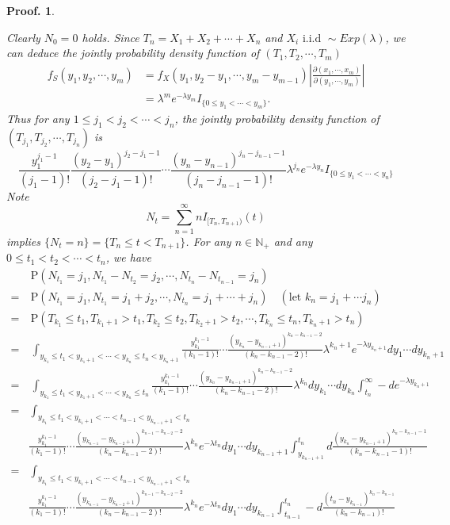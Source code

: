 \documentclass{article}
\theoremstyle{nonumberplain}
\newtheorem{Proof}{Proof.}
\begin{document}
\begin{Proof}
\begin{itemize}
	\noindent Clearly $N_0=0$ holds. Since $T_n=X_1+X_2+\cdots+X_n$ and $X_i\text{ i.i.d }\sim Exp(\lambda)$, we can deduce the jointly probability density function of $(T_1,T_2,\cdots,T_m)$ 
	\begin{align*}
	f_S(y_1,y_2,\cdots,y_m)&=f_X(y_1,y_2-y_1,\cdots,y_m-y_{m-1})\left|\frac{\partial(x_1,\cdots,x_m)}{\partial(y_1,\cdots,y_m)}\right|\\
	&=\lambda^m e^{-\lambda y_m}I_{\{0\le y_1<\cdots<y_m\}}.
	\end{align*}
	Thus for any $1\le j_1<j_2<\cdots<j_n$, the jointly probability density function of $(T_{j_1},T_{j_2},\cdots,T_{j_n})$ is
	\[
	\frac{y_1^{j_1-1}}{(j_1-1)!}\frac{(y_2-y_1)^{j_2-j_1-1}}{(j_2-j_1-1)!}\cdots\frac{(y_n-y_{n-1})^{j_n-j_{n-1}-1}}{(j_n-j_{n-1}-1)!}\lambda^{j_n}e^{-\lambda y_n}I_{\{0\le y_1<\cdots<y_n\}}
	\]
	Note $$N_t=\sum_{n=1}^{\infty}nI_{[T_n,T_{n+1})}(t)$$ implies $\{N_t=n\}=\{T_n\le t<T_{n+1}\}$. For any $n\in \mathbb{N}_+$ and any $0\le t_1<t_2<\cdots<t_n$, we have
	\begin{align*}
	&\ \mathrm{P}(N_{t_1}=j_1,N_{t_1}-N_{t_2}=j_2,\cdots,N_{t_{n}}-N_{t_{n-1}}=j_n)\\
	=&\ 
	\mathrm{P}(N_{t_1}=j_1,N_{t_1}=j_1+j_2,\cdots,N_{t_{n}}=j_1+\cdots+j_n)\quad(\text{let }k_n=j_1+\cdots j_n)\\
	=&\ \mathrm{P}(T_{k_1}\le t_1,T_{k_1+1}>t_1,T_{k_2}\le t_2,T_{k_2+1}>t_2,\cdots,T_{k_n}\le t_n,T_{k_n+1}>t_n)\\
	=&\ \int_{y_{k_1}\le t_1<y_{k_1+1}<\cdots<y_{k_n}\le t_n<y_{k_n+1}} \frac{y_{k_1}^{k_1-1}}{(k_1-1)!}\cdots\frac{(y_{k_n}-y_{k_{n-1}+1})^{k_n-k_{n-1}-2}}{(k_n-k_{n-1}-2)!}\lambda^{k_n+1}e^{-\lambda y_{k_n+1}}dy_1\cdots dy_{k_n+1}\\
	=&\ \int_{y_{k_1}\le t_1<y_{k_1+1}<\cdots<y_{k_n}\le t_n} \frac{y_{k_1}^{k_1-1}}{(k_1-1)!}\cdots\frac{(y_{k_n}-y_{k_{n-1}+1})^{k_n-k_{n-1}-2}}{(k_n-k_{n-1}-2)!}\lambda^{k_n}dy_{k_1}\cdots dy_{k_n}\int_{t_n}^{\infty}-de^{-\lambda y_{k_n+1}}\\
	=&\ \int_{y_{k_1}\le t_1<y_{k_1+1}<\cdots<t_{n-1}<y_{k_{n-1}+1}< t_n}\\
	&\frac{y_{k_1}^{k_1-1}}{(k_1-1)!}\cdots\frac{(y_{k_{n-1}}-y_{k_{n-2}+1})^{k_{n-1}-k_{n-2}-2}}{(k_n-k_{n-1}-2)!}\lambda^{k_n}e^{-\lambda t_n}dy_1\cdots dy_{k_{n-1}+1}\int_{y_{k_{n-1}+1}}^{t_n}d\frac{(y_{k_n}-y_{k_{n-1}+1})^{k_n-k_{n-1}-1}}{(k_n-k_{n-1}-1)!}\\
	=&\ \int_{y_{k_1}\le t_1<y_{k_1+1}<\cdots<t_{n-1}<y_{k_{n-1}+1}<t_n}\\
	&\frac{y_{k_1}^{k_1-1}}{(k_1-1)!}\cdots\frac{(y_{k_{n-1}}-y_{k_{n-2}+1})^{k_{n-1}-k_{n-2}-2}}{(k_n-k_{n-1}-2)!}\lambda^{k_n}e^{-\lambda t_n}dy_1\cdots dy_{k_{n-1}}\int_{t_{n-1}}^{t_n}-d\frac{(t_{n}-y_{k_{n-1}})^{k_n-k_{n-1}}}{(k_n-k_{n-1})!}\\

\end{align*}
\end{itemize}
\end{Proof}
\end{document}
